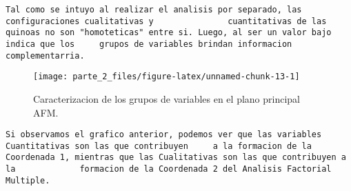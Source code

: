 \documentclass[
]{article}
\begin{document}
\begin{verbatim}
Tal como se intuyo al realizar el analisis por separado, las configuraciones cualitativas y               cuantitativas de las quinoas no son "homoteticas" entre si. Luego, al ser un valor bajo indica que los     grupos de variables brindan informacion complementarria.
\end{verbatim}

\begin{figure}[H]

{\centering \texttt{[image: parte\_2\_files/figure-latex/unnamed-chunk-13-1]} 

}

\caption{Caracterizacion de los grupos de variables en el plano principal AFM.}\label{fig:unnamed-chunk-13}
\end{figure}

\begin{verbatim}
Si observamos el grafico anterior, podemos ver que las variables Cuantitativas son las que contribuyen     a la formacion de la Coordenada 1, mientras que las Cualitativas son las que contribuyen a la             formacion de la Coordenada 2 del Analisis Factorial Multiple.
\end{verbatim}
\end{document}
